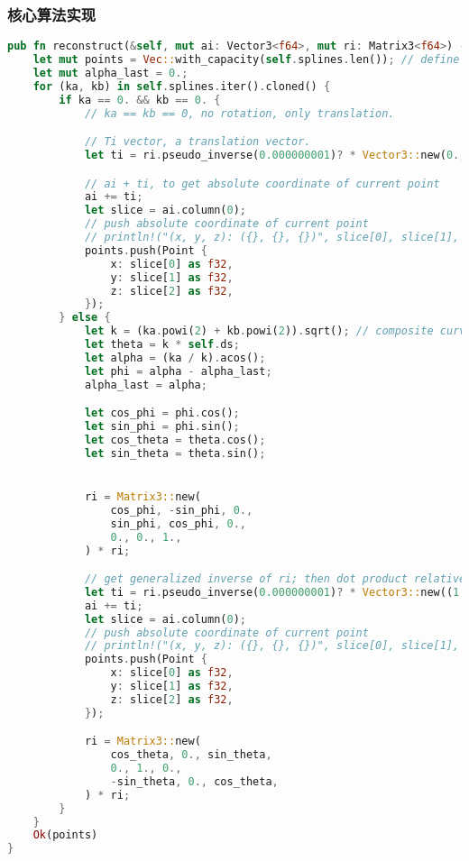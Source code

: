 \subsubsection{核心算法实现}
\begin{lstlisting}[language=Rust, style=boxed]
pub fn reconstruct(&self, mut ai: Vector3<f64>, mut ri: Matrix3<f64>) -> Result<Vec<Point>, &'static str> {
    let mut points = Vec::with_capacity(self.splines.len()); // define points vector and reserve capacity
    let mut alpha_last = 0.;
    for (ka, kb) in self.splines.iter().cloned() {
        if ka == 0. && kb == 0. {
            // ka == kb == 0, no rotation, only translation.

            // Ti vector, a translation vector.
            let ti = ri.pseudo_inverse(0.000000001)? * Vector3::new(0., 0., self.ds);

            // ai + ti, to get absolute coordinate of current point
            ai += ti;
            let slice = ai.column(0);
            // push absolute coordinate of current point
            // println!("(x, y, z): ({}, {}, {})", slice[0], slice[1], slice[2]);
            points.push(Point {
                x: slice[0] as f32,
                y: slice[1] as f32,
                z: slice[2] as f32,
            });
        } else {
            let k = (ka.powi(2) + kb.powi(2)).sqrt(); // composite curvature
            let theta = k * self.ds;
            let alpha = (ka / k).acos();
            let phi = alpha - alpha_last;
            alpha_last = alpha;

            let cos_phi = phi.cos();
            let sin_phi = phi.sin();
            let cos_theta = theta.cos();
            let sin_theta = theta.sin();


            ri = Matrix3::new(
                cos_phi, -sin_phi, 0.,
                sin_phi, cos_phi, 0.,
                0., 0., 1.,
            ) * ri;

            // get generalized inverse of ri; then dot product relative coordinate
            let ti = ri.pseudo_inverse(0.000000001)? * Vector3::new((1. - cos_theta) / k, 0., sin_theta / k);
            ai += ti;
            let slice = ai.column(0);
            // push absolute coordinate of current point
            // println!("(x, y, z): ({}, {}, {})", slice[0], slice[1], slice[2]);
            points.push(Point {
                x: slice[0] as f32,
                y: slice[1] as f32,
                z: slice[2] as f32,
            });

            ri = Matrix3::new(
                cos_theta, 0., sin_theta,
                0., 1., 0.,
                -sin_theta, 0., cos_theta,
            ) * ri;
        }
    }
    Ok(points)
}
\end{lstlisting}